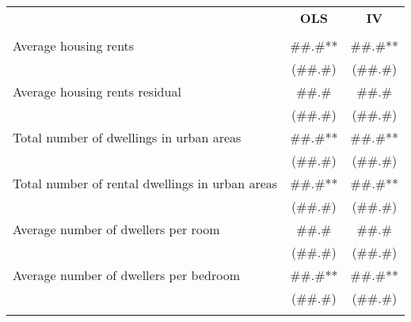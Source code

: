 \begin{tabular}{rcc}
\toprule
      & \multirow{2}[2]{*}{\textbf{OLS}} & \multirow{2}[2]{*}{\textbf{IV}} \\
      &       &  \\
\cmidrule{2-3}      &       &  \\
\multicolumn{1}{l}{Average housing rents} & \#\#.\#** & \#\#.\#** \\
      & (\#\#.\#) & (\#\#.\#) \\
\multicolumn{1}{l}{Average housing rents residual} & \#\#.\# & \#\#.\# \\
      & (\#\#.\#) & (\#\#.\#) \\
\multicolumn{1}{l}{Total number of dwellings in urban areas} & \#\#.\#** & \#\#.\#** \\
      & (\#\#.\#) & (\#\#.\#) \\
\multicolumn{1}{l}{Total number of rental dwellings in urban areas} & \#\#.\#** & \#\#.\#** \\
      & (\#\#.\#) & (\#\#.\#) \\
\multicolumn{1}{l}{Average number of dwellers per room} & \#\#.\# & \#\#.\# \\
      & (\#\#.\#) & (\#\#.\#) \\
\multicolumn{1}{l}{Average number of dwellers per bedroom} & \#\#.\#** & \#\#.\#** \\
      & (\#\#.\#) & (\#\#.\#) \\
      &       &  \\
\bottomrule
\end{tabular}%
